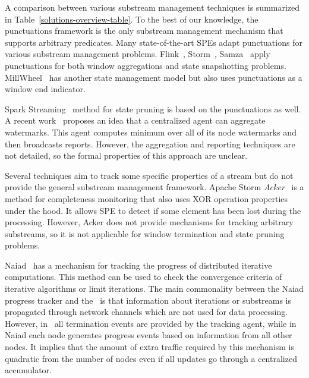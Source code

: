 \label {fs-acker-related}

A comparison between various substream management techniques is summarized in Table~\ref{solutions-overview-table}. To the best of our knowledge, the punctuations framework is the only substream management mechanism that supports arbitrary predicates. Many state-of-the-art SPEs adapt punctuations for various substream management problems. Flink~\cite{Carbone:2017:SMA:3137765.3137777}, Storm~\cite{Toshniwal:2014:STO:2588555.2595641}, Samza~\cite{Noghabi:2017:SSS:3137765.3137770} apply punctuations for both window aggregations and state snapshotting problems. MillWheel~\cite{Akidau:2013:MFS:2536222.2536229} has another state management model but also uses punctuations as a window end indicator. 

Spark Streaming~\cite{Zaharia:2012:DSE:2342763.2342773} method for state pruning is based on the punctuations as well. A recent work~\cite{DBLP:journals/pvldb/BegoliACHKKMS21} proposes an idea that a centralized agent can aggregate watermarks. This agent computes minimum over all of its node watermarks and then broadcasts reports. However, the aggregation and reporting techniques are not detailed, so the formal properties of this approach are unclear. 

Several techniques aim to track some specific properties of a stream but do not provide the general substream management framework. Apache Storm {\em Acker}~\cite{apache:storm:acker} is a method for completeness monitoring that also uses XOR operation properties under the hood. It allows SPE to detect if some element has been lost during the processing. However, Acker does not provide mechanisms for tracking arbitrary substreams, so it is not applicable for window termination and state pruning problems. 

Naiad~\cite{Murray:2013:NTD:2517349.2522738} has a mechanism for tracking the progress of distributed iterative computations. This method can be used to check the convergence criteria of iterative algorithms or limit iterations. The main commonality between the Naiad progress tracker and the \tracker\ is that information about iterations or substreams is propagated through network channels which are not used for data processing. However, in \tracker\ all termination events are provided by the tracking agent, while in Naiad each node generates progress events based on information from all other nodes. It implies that the amount of extra traffic required by this mechanism is quadratic from the number of nodes even if all updates go through a centralized accumulator.

